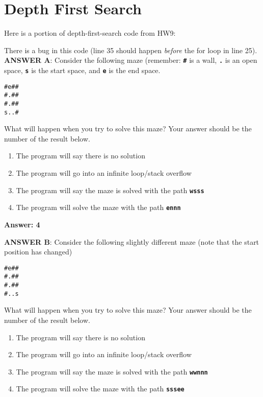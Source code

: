 \newpage
\section{Depth First Search}

Here is a portion of depth-first-search code from HW9:

\resetlinenumber[1]
\linenumbers
\begin{tt}
  
\end{tt}
\nolinenumbers

There is a bug in this code (line 35 should happen {\em before} the for loop in line 25).
\\

{\bf ANSWER A}: Consider the following maze (remember: {\tt\bf \#} is a wall, {\tt\bf .} is an open space, {\tt\bf s} is the start space, and {\tt\bf e} is the end space.

\begin{verbatim}
#e##
#.##
#.##
s..#
\end{verbatim}

What will happen when you try to solve this maze? Your answer should be the number of the result below.

\begin{enumerate}
\item The program will say there is no solution
\item The program will go into an infinite loop/stack overflow
\item The program will say the maze is solved with the path {\tt\bf wsss}
\item The program will solve the maze with the path {\tt\bf ennn}	
\end{enumerate}

\ifexam

\else

{\bf Answer: 4}

\fi

{\bf ANSWER B}: Consider the following slightly different maze (note that the start position has changed)

\begin{verbatim}
#e##
#.##
#.##
#..s
\end{verbatim}

What will happen when you try to solve this maze? Your answer should be the number of the result below.

\begin{enumerate}
\item The program will say there is no solution
\item The program will go into an infinite loop/stack overflow
\item The program will say the maze is solved with the path {\tt\bf wwnnn}
\item The program will solve the maze with the path {\tt\bf sssee}	
\end{enumerate}

